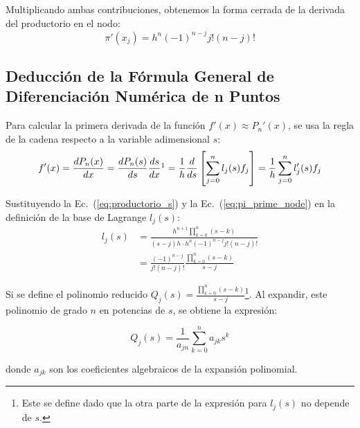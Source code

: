 \documentclass[11pt, a4paper]{article}
\begin{document}
	Multiplicando ambas contribuciones, obtenemos la forma cerrada de la derivada del productorio en el nodo:
	\begin{equation}
		\pi'(x_j) = h^n (-1)^{n-j} j! (n-j)!
		\label{eq:pi_prime_node}
	\end{equation}
	
	\subsection{Deducción de la Fórmula General de Diferenciación Numérica de n Puntos}
	
	Para calcular la primera derivada de la función $f'(x) \approx P_n'(x)$, se usa la regla de la cadena respecto a la variable adimensional $s$:
	\begin{equation}
		f'(x) = \frac{d P_n(x)}{dx} = \frac{d P_n(s)}{ds} \frac{ds}{dx} \footnotemark = \frac{1}{h} \frac{d}{ds} \left[ \sum_{j=0}^{n} l_j(s) f_j \right] = \frac{1}{h} \sum_{j=0}^{n} l_j'(s) f_j
		\label{eq:chain_rule_diff}
	\end{equation}
	
	
	Sustituyendo la Ec.~(\ref{eq:productorio_s}) y la Ec.~(\ref{eq:pi_prime_node}) en la definición de la base de Lagrange $l_j(s)$:
	\begin{align}
		l_j(s) &= \frac{h^{n+1} \prod_{k=0}^{n} (s - k)}{(s - j)h \cdot h^n (-1)^{n-j} j! (n-j)!} \nonumber \\
		&= \frac{(-1)^{n-j}}{j! (n-j)!} \frac{\prod_{k=0}^{n} (s - k)}{s - j}
	\end{align}
	
	Si se define el polinomio reducido $Q_j(s) = \frac{\prod_{k=0}^{n} (s - k)}{s - j}$\footnote{Este se define dado que la otra parte de la expresión para $l_j (s)$ no depende de $s$.}. Al expandir, este polinomio de grado $n$ en potencias de $s$, se obtiene la expresión:
	
	\begin{equation}
		Q_j(s) = \frac{1}{a_{jn}} \sum_{k=0}^{n} a_{jk} s^k
	\end{equation}
	
	donde $a_{jk}$ son los coeficientes algebraicos de la expansión polinomial.
	
\end{document}
